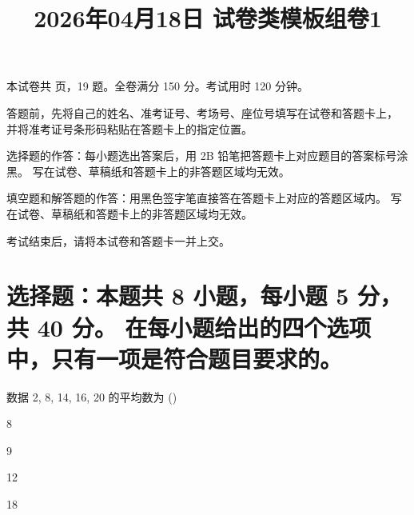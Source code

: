 \documentclass{exam-zh}
\title{2026年04月18日 试卷类模板组卷1}
\begin{document}

\secret

\maketitle
\begin{center}
    本试卷共 \pageref{LastPage} 页，19 题。全卷满分 150 分。考试用时 120 分钟。
\end{center}


\begin{notice}
  \item 答题前，先将自己的姓名、准考证号、考场号、座位号填写在试卷和答题卡上，
    并将准考证号条形码粘贴在答题卡上的指定位置。
  \item 选择题的作答：每小题选出答案后，用 2B 铅笔把答题卡上对应题目的答案标号涂黑。
    写在试卷、草稿纸和答题卡上的非答题区域均无效。
  \item 填空题和解答题的作答：用黑色签字笔直接答在答题卡上对应的答题区域内。
    写在试卷、草稿纸和答题卡上的非答题区域均无效。
  \item 考试结束后，请将本试卷和答题卡一并上交。
\end{notice}



\section{%
  选择题：本题共 8 小题，每小题 5 分，共 40 分。
  在每小题给出的四个选项中，只有一项是符合题目要求的。
}


\begin{question}
数据 2, 8, 14, 16, 20 的平均数为
(\hspace{1cm})
\begin{choices}
\item 8
\item 9
\item 12
\item 18
\end{choices}
\end{question}

\end{document}
